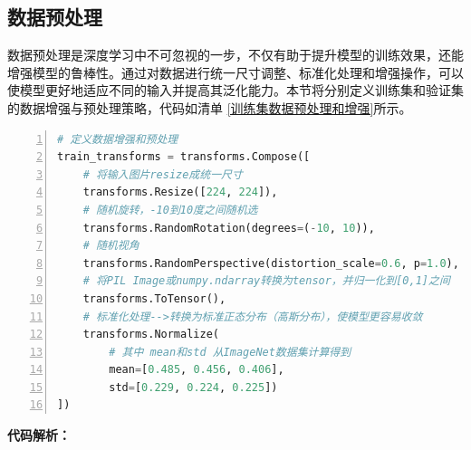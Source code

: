 \subsection{数据预处理}

数据预处理是深度学习中不可忽视的一步，不仅有助于提升模型的训练效果，还能增强模型的鲁棒性。通过对数据进行统一尺寸调整、标准化处理和增强操作，可以使模型更好地适应不同的输入并提高其泛化能力。本节将分别定义训练集和验证集的数据增强与预处理策略，代码如清单 \ref{训练集数据预处理和增强}所示。
\begin{lstlisting}[language=Python, label={训练集数据预处理和增强}, caption={训练集数据预处理和增强}, basicstyle=\footnotesize\ttfamily, breaklines=true, numbers=left, frame=single,keepspaces=true,showstringspaces=false]
# 定义数据增强和预处理
train_transforms = transforms.Compose([
    # 将输入图片resize成统一尺寸
    transforms.Resize([224, 224]), 
    # 随机旋转，-10到10度之间随机选
    transforms.RandomRotation(degrees=(-10, 10)), 
    # 随机视角
    transforms.RandomPerspective(distortion_scale=0.6, p=1.0), 
    # 将PIL Image或numpy.ndarray转换为tensor，并归一化到[0,1]之间
    transforms.ToTensor(),   
    # 标准化处理-->转换为标准正态分布（高斯分布），使模型更容易收敛
    transforms.Normalize(       
        # 其中 mean和std 从ImageNet数据集计算得到
        mean=[0.485, 0.456, 0.406], 
        std=[0.229, 0.224, 0.225])  
])
\end{lstlisting}

\textbf{代码解析：}


